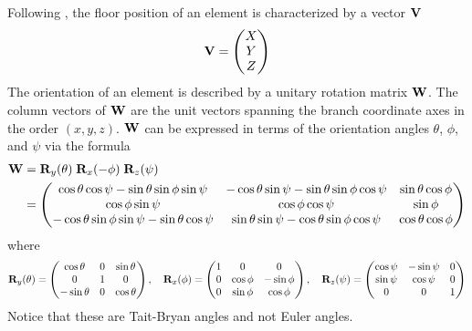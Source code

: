 Following \mad, the floor position of an element is characterized by a vector ${\bf V}$
\begin{equation}
  {\bf V} = 
  \begin{pmatrix}
    X \\ Y \\ Z 
  \end{pmatrix}
\end{equation}
The orientation of an element is described by a unitary rotation matrix ${\bf W}$. The column vectors
of ${\bf W}$ are the unit vectors spanning the branch coordinate axes in the order $(x, y, z)$. ${\bf W}$
can be expressed in terms of the orientation angles $\theta$, $\phi$, and $\psi$ via the formula
\begin{align}
  {\bf W} &= {\bf R}_{y}(\theta) \; {\bf R}_{x}(-\phi) \; {\bf R}_{z}(\psi) 
  \label{wwww} \\
  &= \begin{pmatrix}
    \cos\theta \cos\psi - \sin\theta \sin\phi \sin\psi & 
        -\cos\theta \sin\psi - \sin\theta \sin\phi \cos\psi & 
         \sin\theta \cos\phi \\
    \cos\phi \sin\psi & \cos\phi \cos\psi & \sin\phi \\
   -\cos\theta \sin\phi \sin\psi - \sin\theta \cos\psi & 
         \sin\theta \sin\psi - \cos\theta \sin\phi \cos\psi & 
         \cos\theta \cos\phi 
  \end{pmatrix}
  \nonumber
\end{align}
where
\begin{equation}
  {\bf R}_{y}(\theta) = 
  \begin{pmatrix}
    \cos\theta  & 0 & \sin\theta \\
    0           & 1 & 0          \\
    -\sin\theta & 0 & \cos\theta 
  \end{pmatrix}, \quad
  {\bf R}_{x}(\phi) = 
  \begin{pmatrix}
    1 & 0 & 0                \\
    0 & \cos\phi & -\sin\phi \\
    0 & \sin\phi &  \cos\phi 
  \end{pmatrix}, \quad
  {\bf R}_{z}(\psi) = 
  \begin{pmatrix}
    \cos\psi & -\sin\psi & 0 \\
    \sin\psi &  \cos\psi & 0 \\
    0        &  0        & 1                
  \end{pmatrix}
  \label{wtt0t}
\end{equation}
Notice that these are Tait-Bryan angles and not Euler angles.

